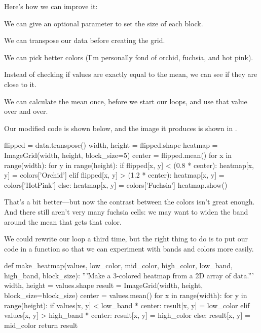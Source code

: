 Here's how we can improve it:

\begin{swcenumerate}
\item
  We can give  an optional parameter
   to set the size of each block.
\item
  We can transpose our data before creating the grid.
\item
  We can pick better colors (I'm personally fond of orchid, fuchsia, and
  hot pink).
\item
  Instead of checking if values are exactly equal to the mean, we can
  see if they are close to it.
\item
  We can calculate the mean once, before we start our loops, and use
  that value over and over.
\end{swcenumerate}

Our modified code is shown below,
and the image it produces is shown in .

\begin{VerbIn}
flipped = data.transpose()
width, height = flipped.shape
heatmap = ImageGrid(width, height, block_size=5)
center = flipped.mean()
for x in range(width):
    for y in range(height):
        if flipped[x, y] < (0.8 * center):
            heatmap[x, y] = colors['Orchid']
        elif flipped[x, y] > (1.2 * center):
            heatmap[x, y] = colors['HotPink']
        else:
            heatmap[x, y] = colors['Fuchsia']
heatmap.show()
\end{VerbIn}


That's a bit better---but now the contrast between the colors isn't
great enough. And there still aren't very many fuchsia cells: we may
want to widen the band around the mean that gets that color.

We could rewrite our loop a third time, but the right thing to do is to
put our code in a function so that we can experiment with bands and
colors more easily.

\begin{VerbIn}
def make_heatmap(values, low_color, mid_color, high_color, low_band, high_band, block_size):
    '''Make a 3-colored heatmap from a 2D array of data.'''
    width, height = values.shape
    result = ImageGrid(width, height, block_size=block_size)
    center = values.mean()
    for x in range(width):
        for y in range(height):
            if values[x, y] < low_band * center:
                result[x, y] = low_color
            elif values[x, y] > high_band * center:
                result[x, y] = high_color
            else:
                result[x, y] = mid_color
    return result
\end{VerbIn}

